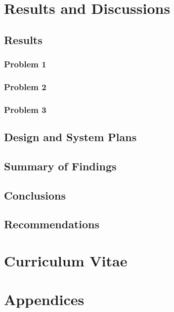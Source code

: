 \documentclass{research}
\begin{document}
\chapter{Results and Discussions}

\section{Results}

\subsection{Problem 1}

\subsection{Problem 2}

\subsection{Problem 3}

\section{Design and System Plans}

\section{Summary of Findings}

\section{Conclusions}

\section{Recommendations}


\clearpage

\printbibliography

\clearpage

\chapter*{Curriculum Vitae}

\chapter*{Appendices}
\end{document}
